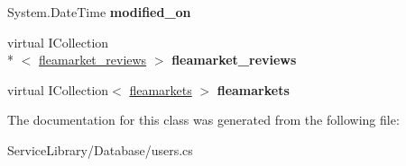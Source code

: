 \begin{DoxyCompactItemize}
\item 
\hypertarget{class_service_library_1_1_database_1_1users_af5f80d334bb21d5b3bf105ab3a82e24d}{System.\-Date\-Time {\bfseries modified\-\_\-on}}\label{class_service_library_1_1_database_1_1users_af5f80d334bb21d5b3bf105ab3a82e24d}

\item 
\hypertarget{class_service_library_1_1_database_1_1users_add4e06595ab643210dfc180f00007d61}{virtual I\-Collection\\*
$<$ \hyperlink{class_service_library_1_1_database_1_1fleamarket__reviews}{fleamarket\-\_\-reviews} $>$ {\bfseries fleamarket\-\_\-reviews}}\label{class_service_library_1_1_database_1_1users_add4e06595ab643210dfc180f00007d61}

\item 
\hypertarget{class_service_library_1_1_database_1_1users_a25f7b4d369a3f19d2bc8b33f51865d3b}{virtual I\-Collection$<$ \hyperlink{class_service_library_1_1_database_1_1fleamarkets}{fleamarkets} $>$ {\bfseries fleamarkets}}\label{class_service_library_1_1_database_1_1users_a25f7b4d369a3f19d2bc8b33f51865d3b}

\end{DoxyCompactItemize}


The documentation for this class was generated from the following file\-:\begin{DoxyCompactItemize}
\item 
Service\-Library/\-Database/users.\-cs\end{DoxyCompactItemize}
